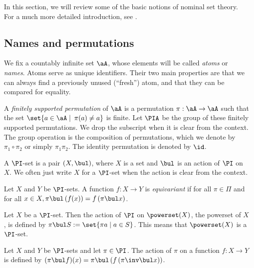\documentclass[twoside,11pt]{entics}
\begin{document}
In this section, we will review some of the basic notions of nominal
set theory. For a much more detailed introduction, see \cite{Pitts2013}.

\subsection{Names and permutations}

We fix a countably infinite set $\aA$, whose elements will be called
\emph{atoms} or \emph{names}. Atoms serve as unique identifiers. Their
two main properties are that we can always find a previously unused
(``fresh'') atom, and that they can be compared for equality.

\begin{xdefinition}
  A \emph{finitely supported permutation} of $\aA$ is a permutation
  $\pi:\aA\to\aA$ such that the set $\set{a\in \aA\mid \: \pi(a) \neq
    a }$ is finite. Let $\PIA$ be the group of these finitely
  supported permutations. We drop the subscript when it is clear from
  the context. The group operation is the composition of permutations,
  which we denote by $\pi_1\circ\pi_2$ or simply $\pi_1\pi_2$. The
  identity permutation is denoted by $\id$.
\end{xdefinition}

\begin{xdefinition}
A $\PI$-set is a pair $(X,\bul)$, where $X$ is a set and $\bul$ is an action of $\PI$ on $X$. We often just write $X$ for a $\PI$-set when the action is clear from the context.
\end{xdefinition}

\begin{xdefinition}
Let $X$ and $Y$ be $\PI$-sets. A function $f:X\to Y$ is \emph{equivariant} if for all  $\pi\in \Pi$ and for all $x\in X, \pi\bul \left( f(x) \right)=f\left( \pi\bul x \right)$.
\end{xdefinition}

\begin{xdefinition}
  Let $X$ be a $\PI$-set. Then the action of $\PI$ on $\powerset(X)$,
  the powerset of $X$, is defined by $\pi \bul S := \set{ \pi a
    \mid a\in S }$. This means that $\powerset(X)$ is a $\PI$-set.
\end{xdefinition}

\begin{xdefinition}\label{def:function-pi-action}
Let $X$ and $Y$ be $\PI$-sets and let $\pi \in \PI$. The action of
$\pi$ on a function $f:X\to Y$ is defined by $(\pi \bul f)(x) = \pi
\bul \left(f \left( \pi\inv \bul x\right) \right)$.
\end{xdefinition}
\end{document}
